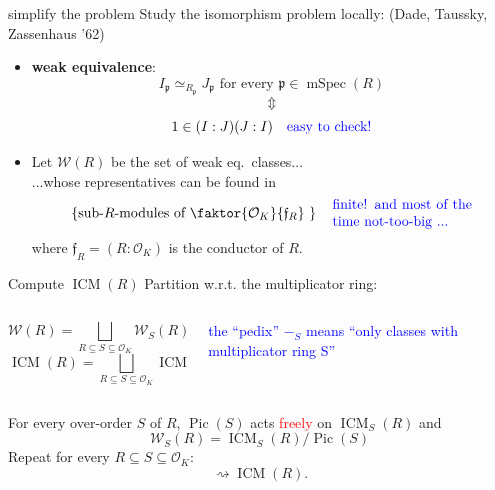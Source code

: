 \documentclass[usenames,dvipsnames]{beamer}
\DeclareMathOperator{\ICM}{ICM}
\DeclareMathOperator{\Pic}{Pic}
\DeclareMathOperator{\mSpec}{mSpec}
\newcommand{\cO}{{\mathcal O}}
\newcommand{\cW}{{\mathcal W}}
\newcommand{\p}{{\mathfrak p}}
\newcommand{\frf}{{\mathfrak f}}
\newcommand{\set}[1]{\left\lbrace#1\right\rbrace }
\newcommand{\red}[1]{\textcolor{red}{#1}}
\begin{document}
\begin{frame}{ simplify the problem  }
    Study the isomorphism problem locally: (Dade, Taussky, Zassenhaus '62)
    \begin{itemize}
\pause 
    \item  \textbf{weak equivalence}:
    \[I_{\p}\simeq_{R_{\p}} J_{\p} \text{ for every } {\p} \in \mSpec(R)\]
\pause
    \vspace{-6mm}\[\Updownarrow\]
    \[1\in (I:J)(J:I)\quad \textcolor{blue}{\text{easy to check!}}\]
\pause
    \item Let $\cW(R)$ be the set of weak eq.~classes...\\
\pause
    ...whose representatives can be found in
    \[\set{\text{sub-$R$-modules of $\faktor{\cO_K}{\frf_R}$ }} \quad \textcolor{blue}{\parbox{10 em}{finite! and most of the time not-too-big ...}}\]
    where $\frf_R=(R:\cO_K)$ is the conductor of $R$.
    \end{itemize}
\end{frame}

\begin{frame}{ Compute $\ICM(R)$ }
\pause 
    Partition w.r.t. the multiplicator ring:
    \begin{columns}
    \begin{column}{0.5\textwidth}
      \[ \cW(R) = \bigsqcup_{R\subseteq S \subseteq \cO_K} \cW_S(R)\]
      \[ \ICM(R) = \bigsqcup_{R\subseteq S \subseteq \cO_K} \ICM_S(R)\]
    \end{column}
\pause
    \begin{column}{0.5\textwidth}  %
    \begin{center}
    \textcolor{blue}{\parbox{10em}{the ``pedix'' $-_S$ means ``only classes with multiplicator ring S''}} 
    \end{center}
    \end{column}
    \end{columns}
\pause
    \begin{theorem}[M.]
    For every over-order $S$ of $R$, $\Pic(S)$ acts \red{freely} on $\ICM_S(R)$ and
    \[ \cW_S(R) = \ICM_S(R) / \Pic(S) \]
\pause
    Repeat for every $R\subseteq S \subseteq \cO_K$:
    \[ \rightsquigarrow \ICM(R).\]
    \end{theorem}
\end{frame}
\end{document}
